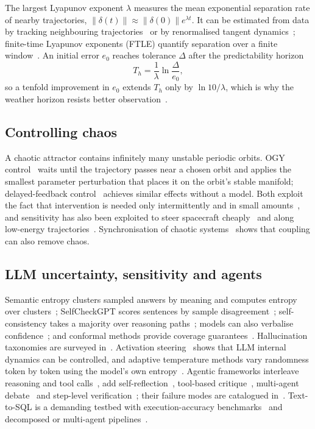 \documentclass[preprint,12pt]{elsarticle}
\begin{document}
The largest Lyapunov exponent $\lambda$ measures the mean exponential separation rate of nearby trajectories, $\|\delta(t)\|\approx\|\delta(0)\|e^{\lambda t}$. It can be estimated from data by tracking neighbouring trajectories~\cite{wolf1985,rosenstein1993} or by renormalised tangent dynamics~\cite{benettin1980}; finite-time Lyapunov exponents (FTLE) quantify separation over a finite window~\cite{shadden2005}. An initial error $e_0$ reaches tolerance $\Delta$ after the predictability horizon
\begin{equation}
T_h=\frac{1}{\lambda}\ln\frac{\Delta}{e_0}, \label{eq:horizon}
\end{equation}
so a tenfold improvement in $e_0$ extends $T_h$ only by $\ln 10/\lambda$, which is why the weather horizon resists better observation~\cite{lorenz1969,zhang2019}.

\subsection{Controlling chaos}
A chaotic attractor contains infinitely many unstable periodic orbits. OGY control~\cite{ott1990} waits until the trajectory passes near a chosen orbit and applies the smallest parameter perturbation that places it on the orbit's stable manifold; delayed-feedback control~\cite{pyragas1992} achieves similar effects without a model. Both exploit the fact that intervention is needed only intermittently and in small amounts~\cite{shinbrot1993,boccaletti2000}, and sensitivity has also been exploited to steer spacecraft cheaply~\cite{shinbrot1993} and along low-energy trajectories~\cite{belbruno1993}. Synchronisation of chaotic systems~\cite{pecora1990} shows that coupling can also remove chaos.

\subsection{LLM uncertainty, sensitivity and agents}
Semantic entropy clusters sampled answers by meaning and computes entropy over clusters~\cite{kuhn2023,farquhar2024}; SelfCheckGPT scores sentences by sample disagreement~\cite{manakul2023}; self-consistency takes a majority over reasoning paths~\cite{wang2023sc}; models can also verbalise confidence~\cite{kadavath2022}; and conformal methods provide coverage guarantees~\cite{quach2024,mohri2024}. Hallucination taxonomies are surveyed in~\cite{huang2025survey}. Activation steering~\cite{zou2023repe,turner2023,li2023iti} shows that LLM internal dynamics can be controlled, and adaptive temperature methods vary randomness token by token using the model's own entropy~\cite{zhu2024adapt,zhang2024edt}. Agentic frameworks interleave reasoning and tool calls~\cite{yao2023react}, add self-reflection~\cite{shinn2023,madaan2023}, tool-based critique~\cite{gou2024critic}, multi-agent debate~\cite{du2024debate} and step-level verification~\cite{lightman2024}; their failure modes are catalogued in~\cite{cemri2025}. Text-to-SQL is a demanding testbed with execution-accuracy benchmarks~\cite{yu2018spider,li2023bird,lei2025spider2} and decomposed or multi-agent pipelines~\cite{pourreza2023,gao2024dail,talaei2024chess,wang2025macsql}.
\end{document}
